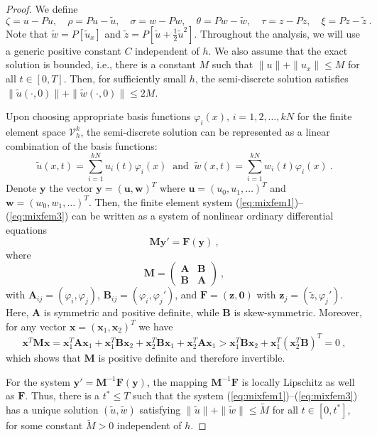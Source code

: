 \documentclass[10pt,a4paper]{amsart}
\newcommand{\bA}{\mathbf{A}}
\newcommand{\bB}{\mathbf{B}}
\newcommand{\bF}{\mathbf{F}}
\newcommand{\bM}{\mathbf{M}}
\newcommand{\bo}{\mathbf{0}}
\newcommand{\bu}{\mathbf{u}}
\newcommand{\bw}{\mathbf{w}}
\newcommand{\bx}{\mathbf{x}}
\newcommand{\by}{\mathbf{y}}
\newcommand{\bz}{\mathbf{z}}
\newcommand{\tz}{\tilde{z}}
\begin{document}
\begin{proof}
We define
$$\zeta=u-Pu,\quad \rho=Pu-\tilde{u},\quad \sigma=w-Pw,\quad \theta=Pw-\tilde{w}, \quad\tau=z-Pz,  \quad \xi=Pz-\tilde{z}\ .$$
Note that $\tilde{w}=P[\tilde{u}_x]$ and $\tilde{z}=P[\tilde{u}+\frac{1}{2}\tilde{u}^2]$. 
%
Throughout the analysis, we will use a generic positive constant $C$ independent of $h$.
%
We also assume that the exact solution is bounded, i.e., there is a constant $M$ such that $\|u\|+\|u_x\|\leq M$ for all $t\in[0,T]$. Then, for sufficiently small $h$, the semi-discrete solution satisfies $\|\tilde{u}(\cdot,0)\|+\|\tilde{w}(\cdot,0)\|\leq 2M$.

Upon choosing appropriate basis functions $\varphi_i(x)$, $i=1,2,\dots,kN$ for the finite element space $\mathcal{V}_h^k$, the semi-discrete solution can be represented as a linear combination of the basis functions:
$$\tilde{u}(x,t)=\sum_{i=1}^{kN} u_i(t) \varphi_i(x) \ \text{ and } \ \tilde{w}(x,t)=\sum_{i=1}^{kN} w_i(t)\varphi_i(x)\ .$$
Denote $\by$ the vector $\by=(\bu,\bw)^T$ where $\bu=(u_0,u_1,\dots)^T$ and $\bw=(w_0,w_1,\dots)^T$.
Then, the finite element system (\ref{eq:mixfem1})--(\ref{eq:mixfem3}) can be written as a system of nonlinear ordinary differential equations
\begin{equation}\label{eq:sysnlodes}
   \bM \by' = \bF(\by)\ ,
\end{equation}
where 
$$\bM = \begin{pmatrix}
    \bA & \bB\\
    \bB & \bA
\end{pmatrix}\ ,$$
with $\bA_{ij}=(\varphi_i,\varphi_j)$, $\bB_{ij}=(\varphi_i,\varphi_j')$, and
$\bF=(\bz,\bo)$ with $\bz_j=(\tz,\varphi_j')$. Here, $\bA$ is symmetric and positive definite, while $\bB$ is skew-symmetric. Moreover, for any vector $\bx=(\bx_1, \bx_2)^T$ we have
$$
 \bx^T\bM \bx = \bx_1^T\bA\bx_1+\bx_1^T\bB\bx_2+\bx_2^T\bB\bx_1+\bx_2^T\bA\bx_1> \bx_1^T\bB\bx_2+\bx_1^T(\bx_2^T\bB)^T= 0\ ,
$$
which shows that $\bM$ is positive definite and therefore invertible. 


For the system $\by'=\bM^{-1}\bF(\by)$, the mapping $\bM^{-1}\bF$ is locally Lipschitz as well as $\bF$. Thus, there is a $t^\ast\leq T$ such that the system (\ref{eq:mixfem1})--(\ref{eq:mixfem3}) has a unique solution $(\tilde{u}, \tilde{w})$ satisfying
$\|\tilde{u}\|+\|\tilde{w}\|\leq \tilde{M}$ for all $t\in [0,t^\ast]$, for some constant $\tilde{M}>0$ independent of $h$.


\end{proof}
\end{document}
